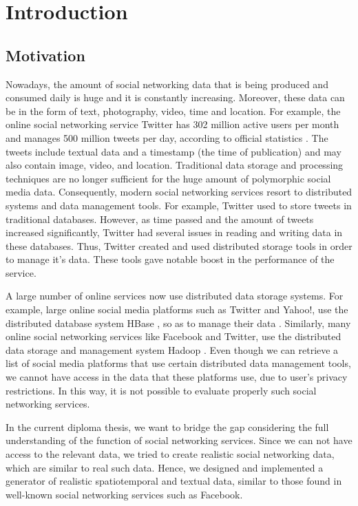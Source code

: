 \setcounter{chapter}{0}

\chapter{Introduction}

\setcounter{chapter}{1}

\section{Motivation}

Nowadays, the amount of social networking data that is being produced and consumed daily is huge and it is constantly increasing.
Moreover, these data can be in the form of text, photography, video, time and location. For example, the online social networking service Twitter 
has 302 million active users per month and manages 500 million tweets per day, according to official statistics \cite {1}. 
The tweets include textual data and a timestamp (the time of publication) and may also contain
image, video, and location. Traditional data storage and processing techniques are no longer sufficient for the huge amount of polymorphic 
social media data. Consequently, modern social networking services
resort to distributed systems and data management tools. For example, Twitter \cite {2} used to 
store tweets in traditional databases. However, as time passed and the amount of tweets increased significantly, Twitter had several issues in 
reading and writing data in these databases. Thus, Twitter created and used distributed storage tools in order to manage it's data. 
These tools gave notable boost in the performance of the service.

A large number of online services now use distributed data storage systems. For example, large online social media platforms 
such as Twitter and Yahoo!, use the distributed database system HBase \cite {3}, so as to manage their data \cite {4}. 
Similarly, many online social networking services like Facebook and Twitter,
use the distributed data storage and management system Hadoop \cite {5} \cite {6}. 
Even though we can retrieve a list of social media platforms that use certain distributed data management tools, 
we cannot have access in the data that these platforms use, due to user's privacy restrictions. 
In this way, it is not possible to 
evaluate properly such social networking services.

In the current diploma thesis, we want to bridge the gap considering the full understanding of the function of social networking services.
Since we can not have access to the relevant data, we tried to create realistic social networking data, which are similar to real such data.
Hence, we designed and implemented a generator of realistic spatiotemporal and textual data, similar to 
those found in well-known social networking services such as Facebook.

